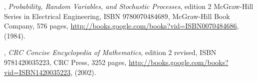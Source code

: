 \begin{thebibliography}{99}
,
                      \emph{Probability, Random Variables, and Stochastic Processes}, edition 2
                      {McGraw-Hill Series in Electrical Engineering},
                      ISBN {9780070484689}, {McGraw-Hill Book Company}, 576 pages,
                      \url{http://books.google.com/books?vid=ISBN0070484686},
                      (1984).

,
                      \emph{CRC Concise Encyclopedia of Mathematics}, edition 2 revised,
                      ISBN {9781420035223}, {CRC Press}, 3252 pages,
                      \url{http://books.google.com/books?vid=ISBN1420035223},
                      (2002).

\end{thebibliography}
